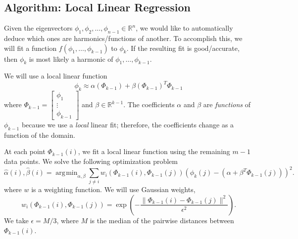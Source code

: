 \documentclass[preprint]{elsarticle}
\DeclareMathOperator*{\argmin}{\arg\!\min}
\begin{document}


\subsection{Algorithm: Local Linear Regression}

Given the eigenvectors $\phi_1, \phi_2, \dots, \phi_{n-1} \in \mathbb{R}^n$, we would like to automatically deduce which ones are harmonics/functions of another. 
%
To accomplish this, we will fit a function $f(\phi_1, \dots, \phi_{k-1})$ to $\phi_{k}$. 
%
If the resulting fit is good/accurate, then $\phi_{k}$ is most likely a harmonic of $\phi_1, \dots, \phi_{k-1}$. 

We will use a local linear function 
\begin{equation}
\phi_k \approx \alpha( \Phi_{k-1}) + \beta(\Phi_{k-1})^T \Phi_{k-1}
\end{equation}
where 
%
$\Phi_{k-1} = \begin{bmatrix} \phi_1 \\ \vdots \\ \phi_{k-1} \end{bmatrix}$
and $\beta \in \mathbb{R}^{k-1}$. 
%
The coefficients $\alpha$ and $\beta$ are {\em functions} of $\phi_{k-1}$ because we use a {\em local} linear fit; therefore, the coefficients change as a function of the domain. 

At each point $\Phi_{k-1}(i)$, we fit a local linear function using the remaining $m-1$ data points. 
%
We solve the following optimization problem 
\begin{equation} \label{eq:opt_problem}
\hat{\alpha} (i) , \hat{\beta}(i)  = \argmin_{\alpha, \beta} \sum_{j \ne i} w_i(\Phi_{k-1}(i), \Phi_{k-1}(j)) \left( \phi_{k}(j) - (\alpha + \beta^T \Phi_{k-1}(j)) \right)^2.
\end{equation}
%
where $w$ is a weighting function.
%
We will use Gaussian weights, 
%
\begin{equation}
w_i(\Phi_{k-1}(i), \Phi_{k-1}(j))  = \exp \left( - \frac{\|\Phi_{k-1}(i) - \Phi_{k-1} (j) \|^2}{\epsilon^2} \right).
\end{equation}
%
We take $\epsilon = M / 3$, where $M$ is the median of the pairwise distances between $\Phi_{k-1}(i)$.
\end{document}
